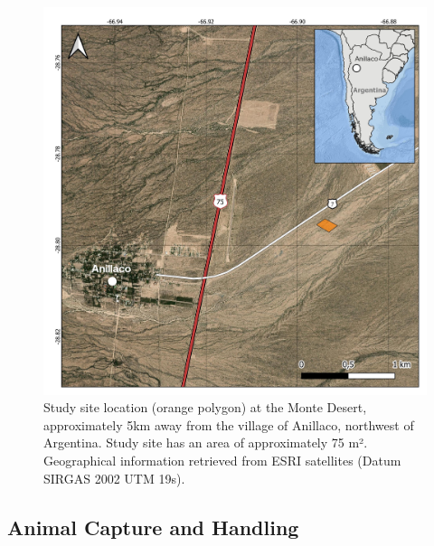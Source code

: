 \documentclass[english,msc,numbers,hidelinks]{coppe}
\begin{document}
  \begin{figure}

  {\centering \includegraphics[width=1\linewidth]{../04_figures/map/tuco_map} 

  }

  \caption{Study site location (orange polygon) at the Monte Desert, approximately 5km away from the village of Anillaco, northwest of Argentina. Study site has an area of approximately 75 m². Geographical information retrieved from ESRI satellites (Datum SIRGAS 2002 UTM 19s).}\label{fig:methods-map}
  \end{figure}
  \hypertarget{animal-capture-and-handling}{%
  \subsection{Animal Capture and Handling}\label{animal-capture-and-handling}}
\end{document}
